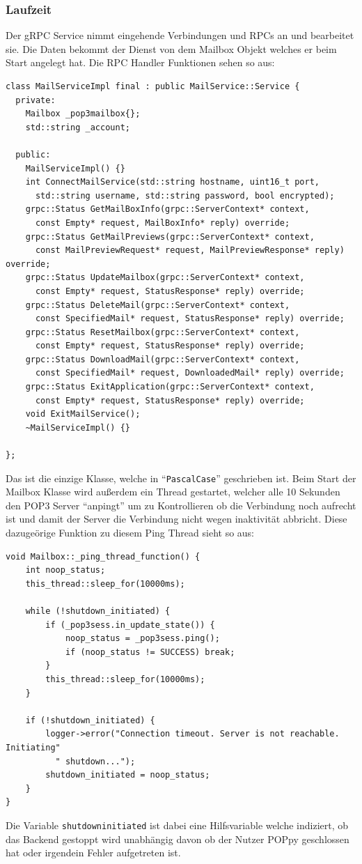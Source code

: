 \documentclass[12pt]{article}
\def\code#1{\texttt{#1}}
\begin{document}
\subsubsection{Laufzeit}
Der gRPC Service nimmt eingehende Verbindungen und RPCs an und bearbeitet sie.
Die Daten bekommt der Dienst von dem Mailbox Objekt welches er beim Start
angelegt hat. Die RPC Handler Funktionen sehen so aus:
\begin{verbatim}
class MailServiceImpl final : public MailService::Service {
  private:
    Mailbox _pop3mailbox{};
    std::string _account;

  public:
    MailServiceImpl() {}
    int ConnectMailService(std::string hostname, uint16_t port, 
      std::string username, std::string password, bool encrypted);
    grpc::Status GetMailBoxInfo(grpc::ServerContext* context, 
      const Empty* request, MailBoxInfo* reply) override;
    grpc::Status GetMailPreviews(grpc::ServerContext* context, 
      const MailPreviewRequest* request, MailPreviewResponse* reply) override;
    grpc::Status UpdateMailbox(grpc::ServerContext* context, 
      const Empty* request, StatusResponse* reply) override;
    grpc::Status DeleteMail(grpc::ServerContext* context, 
      const SpecifiedMail* request, StatusResponse* reply) override;
    grpc::Status ResetMailbox(grpc::ServerContext* context, 
      const Empty* request, StatusResponse* reply) override;
    grpc::Status DownloadMail(grpc::ServerContext* context, 
      const SpecifiedMail* request, DownloadedMail* reply) override;
    grpc::Status ExitApplication(grpc::ServerContext* context, 
      const Empty* request, StatusResponse* reply) override;
    void ExitMailService();
    ~MailServiceImpl() {}

};
\end{verbatim}
Das ist die einzige Klasse, welche in "`\code{PascalCase}"' geschrieben ist.
\newline
Beim Start der Mailbox Klasse wird außerdem ein Thread gestartet,
welcher alle 10 Sekunden den POP3 Server "`anpingt"' um zu Kontrollieren ob die
Verbindung noch aufrecht ist und damit der Server die Verbindung nicht wegen
inaktivität abbricht. Diese dazugeörige Funktion zu diesem Ping Thread sieht so
aus:
\begin{verbatim}
void Mailbox::_ping_thread_function() {
    int noop_status;
    this_thread::sleep_for(10000ms);

    while (!shutdown_initiated) {
        if (_pop3sess.in_update_state()) {
            noop_status = _pop3sess.ping();
            if (noop_status != SUCCESS) break;
        }
        this_thread::sleep_for(10000ms);
    }

    if (!shutdown_initiated) {
        logger->error("Connection timeout. Server is not reachable. Initiating"
          " shutdown...");
        shutdown_initiated = noop_status;
    }
}
\end{verbatim}
Die Variable \code{shutdown\textunderscore initiated} ist dabei eine 
Hilfsvariable welche in­di­zie­rt, ob das Backend gestoppt wird unabhängig davon 
ob der Nutzer POPpy geschlossen hat oder irgendein Fehler aufgetreten ist.
\end{document}
